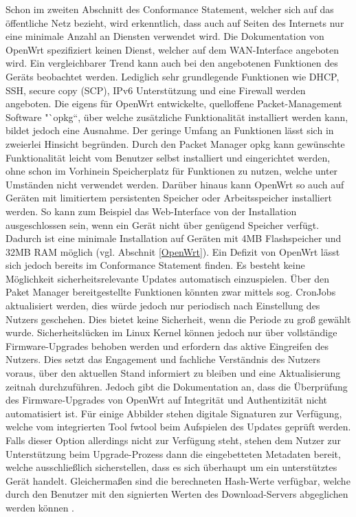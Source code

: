 \documentclass[a4paper]{book}
\begin{document}
\begin{large}
\begin{onehalfspace}
Schon im zweiten Abschnitt des \glqq Conformance Statement\grqq{}, welcher sich auf das öffentliche Netz bezieht, wird erkenntlich, dass auch auf Seiten des Internets nur eine minimale Anzahl an Diensten verwendet wird. Die Dokumentation von OpenWrt spezifiziert keinen Dienst, welcher auf dem WAN-Interface angeboten wird. Ein vergleichbarer Trend kann auch bei den angebotenen Funktionen des Geräts beobachtet werden. Lediglich sehr grundlegende Funktionen wie DHCP, SSH, secure copy (SCP), IPv6 Unterstützung und eine Firewall werden angeboten. Die eigens für OpenWrt entwickelte, quelloffene Packet-Management Software "`opkg“, über welche zusätzliche Funktionalität installiert werden kann, bildet jedoch eine Ausnahme. Der geringe Umfang an Funktionen lässt sich in zweierlei Hinsicht begründen. Durch den Packet Manager opkg kann gewünschte Funktionalität leicht vom Benutzer selbst installiert und eingerichtet werden, ohne schon im Vorhinein Speicherplatz für Funktionen zu nutzen, welche unter Umständen nicht verwendet werden. Darüber hinaus kann OpenWrt so auch auf Geräten mit limitiertem persistenten Speicher oder Arbeitsspeicher installiert werden. So kann zum Beispiel das Web-Interface von der Installation ausgeschlossen sein, wenn ein Gerät nicht über genügend Speicher verfügt. Dadurch ist eine minimale Installation auf Geräten mit 4MB Flashspeicher und 32MB RAM möglich (vgl. Abschnit \ref{OpenWrt}). \newline\indent	
	Ein Defizit von OpenWrt lässt sich jedoch bereits im \glqq Conformance Statement\grqq{} finden. Es besteht keine Möglichkeit sicherheitsrelevante Updates automatisch einzuspielen. Über den Paket Manager bereitgestellte Funktionen könnten zwar mittels sog. CronJobs \mbox aktualisiert werden, dies würde jedoch nur periodisch nach Einstellung des Nutzers geschehen. Dies bietet keine Sicherheit, wenn die Periode zu groß gewählt wurde. Sicherheitslücken im Linux Kernel können jedoch nur über vollständige Firmware-Upgrades behoben werden und erfordern das aktive Eingreifen des Nutzers. Dies setzt das Engagement und fachliche Verständnis des Nutzers voraus, über den aktuellen Stand informiert zu bleiben und eine Aktualisierung zeitnah durchzuführen. Jedoch gibt die Dokumentation an, dass die Überprüfung des Firmware-Upgrades von OpenWrt auf Integrität und Authentizität nicht automatisiert ist. Für einige Abbilder stehen digitale Signaturen zur Verfügung, welche vom integrierten Tool fwtool beim Aufspielen des Updates geprüft werden. Falls dieser Option allerdings nicht zur Verfügung steht, stehen dem Nutzer zur Unterstützung beim Upgrade-Prozess dann die eingebetteten Metadaten bereit, welche ausschließlich sicherstellen, dass es sich überhaupt um ein unterstütztes Gerät handelt. Gleichermaßen sind die berechneten Hash-Werte verfügbar, welche durch den Benutzer mit den signierten Werten des Download-Servers abgeglichen werden können \cite{OpenWrtWebseite.2020b}.	\newline\indent

\end{onehalfspace}
\end{large}
\end{document}
